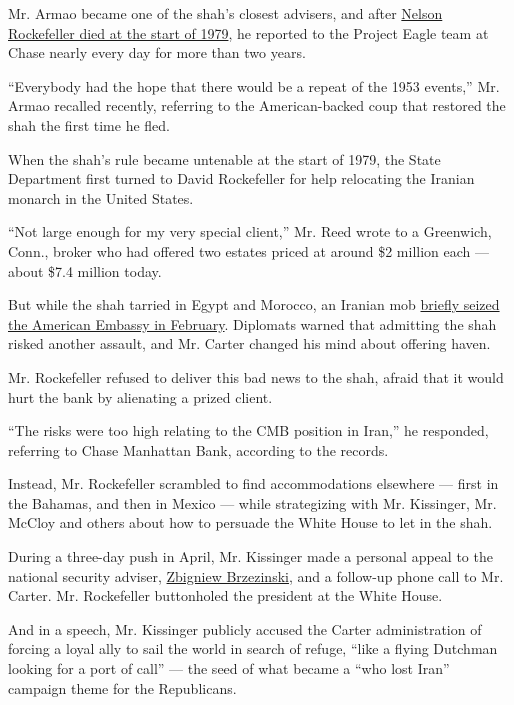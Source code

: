 Mr. Armao became one of the shah's closest advisers, and after
\href{https://www.nytimes.com/1979/01/27/archives/rockefeller-is-dead-at-70-vice-president-under-ford-and-governor.html}{Nelson
Rockefeller died at the start of 1979}, he reported to the Project Eagle
team at Chase nearly every day for more than two years.

``Everybody had the hope that there would be a repeat of the 1953
events,'' Mr. Armao recalled recently, referring to the American-backed
coup that restored the shah the first time he fled.

When the shah's rule became untenable at the start of 1979, the State
Department first turned to David Rockefeller for help relocating the
Iranian monarch in the United States.

``Not large enough for my very special client,'' Mr. Reed wrote to a
Greenwich, Conn., broker who had offered two estates priced at around
\$2 million each --- about \$7.4 million today.

But while the shah tarried in Egypt and Morocco, an Iranian mob
\href{https://www.nytimes.com/1979/02/15/archives/armed-iranians-rush-us-embassy-khomeinis-forces-free-staff-of-100-a.html}{briefly
seized the American Embassy in February}. Diplomats warned that
admitting the shah risked another assault, and Mr. Carter changed his
mind about offering haven.

Mr. Rockefeller refused to deliver this bad news to the shah, afraid
that it would hurt the bank by alienating a prized client.

``The risks were too high relating to the CMB position in Iran,'' he
responded, referring to Chase Manhattan Bank, according to the records.

Instead, Mr. Rockefeller scrambled to find accommodations elsewhere ---
first in the Bahamas, and then in Mexico --- while strategizing with Mr.
Kissinger, Mr. McCloy and others about how to persuade the White House
to let in the shah.

During a three-day push in April, Mr. Kissinger made a personal appeal
to the national security adviser,
\href{https://www.nytimes.com/2017/05/26/us/zbigniew-brzezinski-dead-national-security-adviser-to-carter.html}{Zbigniew
Brzezinski}, and a follow-up phone call to Mr. Carter. Mr. Rockefeller
buttonholed the president at the White House.

And in a speech, Mr. Kissinger publicly accused the Carter
administration of forcing a loyal ally to sail the world in search of
refuge, ``like a flying Dutchman looking for a port of call'' --- the
seed of what became a ``who lost Iran'' campaign theme for the
Republicans.


